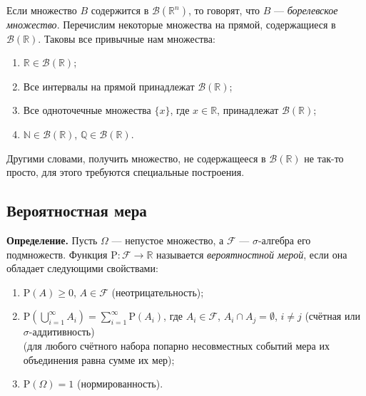 \documentclass[11pt,a4paper]{article}
\providecommand{\tightlist}{%
      \setlength{\itemsep}{0pt}\setlength{\parskip}{0pt}}
\begin{document}
Если множество \(B\) содержится в \(\mathcal{B}(\mathbb{R}^n)\), то
говорят, что \(B\) --- \emph{борелевское множество}. Перечислим
некоторые множества на прямой, содержащиеся в
\(\mathcal{B}(\mathbb{R})\). Таковы все привычные нам множества:

\begin{enumerate}
\def\labelenumi{\arabic{enumi}.}
\tightlist
\item
  \(\mathbb{R} \in \mathcal{B}(\mathbb{R})\);
\item
  Все интервалы на прямой принадлежат \(\mathcal{B}(\mathbb{R})\);
\item
  Все одноточечные множества \(\{x\}\), где \(x \in \mathbb{R}\),
  принадлежат \(\mathcal{B}(\mathbb{R})\);
\item
  \(\mathbb{N} \in \mathcal{B}(\mathbb{R})\),
  \(\mathbb{Q} \in \mathcal{B}(\mathbb{R})\).
\end{enumerate}

Другими словами, получить множество, не содержащееся в
\(\mathcal{B}(\mathbb{R})\) не так-то просто, для этого требуются
специальные построения.

    \hypertarget{ux432ux435ux440ux43eux44fux442ux43dux43eux441ux442ux43dux430ux44f-ux43cux435ux440ux430}{%
\subsection{Вероятностная
мера}\label{ux432ux435ux440ux43eux44fux442ux43dux43eux441ux442ux43dux430ux44f-ux43cux435ux440ux430}}

\textbf{Определение.} Пусть \(\Omega\) --- непустое множество, а
\(\mathcal{F}\) --- \(\sigma\)-алгебра его подмножеств. Функция
\(\mathrm{P}: \mathcal{F} \rightarrow \mathbb{R}\) называется
\emph{вероятностной мерой}, если она обладает следующими свойствами:

\begin{enumerate}
  \item \(\mathrm{P}(A) \ge 0\), \(A \in \mathcal{F}\) (неотрицательность);
  \item \(\mathrm{P}\left( \bigcup\limits_{i=1}^{\infty}A_i \right) = \sum\limits_{i=1}^{\infty}\mathrm{P}(A_i)\), где \(A_i \in \mathcal{F}\), \(A_i \cap A_j = \emptyset\), \(i \ne j\) (счётная или \(\sigma\)-аддитивность)\\
(для любого счётного набора попарно несовместных событий мера их
объединения равна сумме их мер);
  \item \(\mathrm{P}(\Omega) = 1\) (нормированность).
\end{enumerate}
\end{document}
